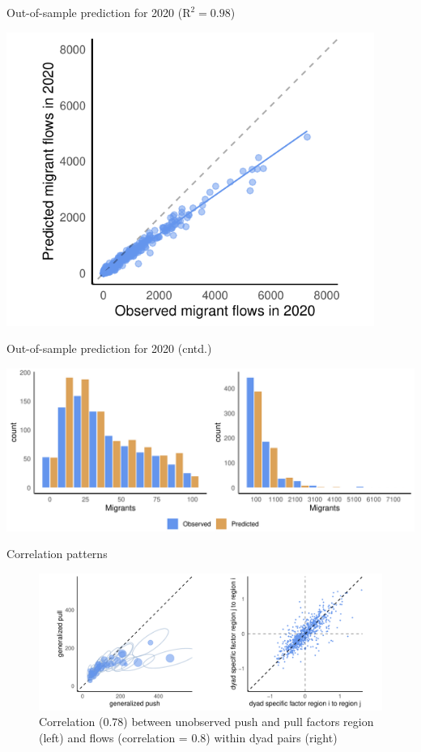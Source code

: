 \documentclass{beamer}
\begin{document}
\begin{frame}{Out-of-sample prediction for 2020 ($\text{R}^{2} = 0.98$)}
	\begin{center}
		\includegraphics[width=0.9\textwidth]{../../fig/prediction_2020}
	\end{center}
\end{frame}

\begin{frame}{Out-of-sample prediction for 2020 (cntd.)}
	\begin{center}
		\includegraphics[width=1\textwidth]{../../fig/hist_fit}
	\end{center}
\end{frame}

\begin{frame}{Correlation patterns}
	\begin{center}
		\begin{figure}
			\includegraphics[width=1\textwidth]{../../fig/country_dyad}
			\caption{Correlation (0.78) between unobserved push and pull factors region (left) and flows (correlation = 0.8) within dyad pairs (right)}
		\end{figure}

	\end{center}
\end{frame}
\end{document}
